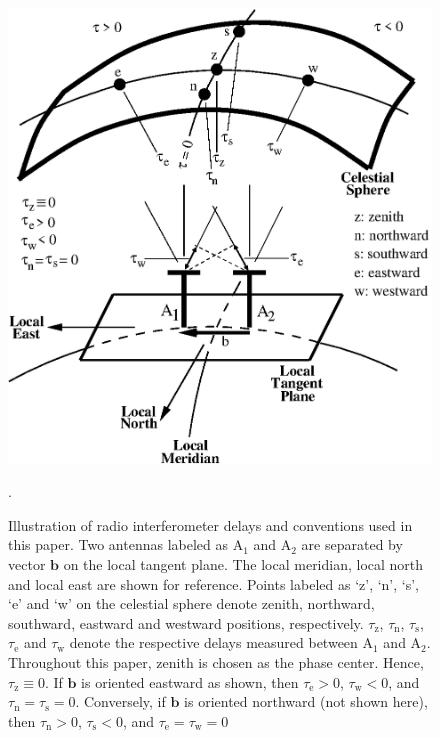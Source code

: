 \documentclass[preprint2,iop,numberedappendix,twocolappendix,appendixfloats]{emulateapj}
\begin{document}
\begin{figure}[htb]
\centering
\includegraphics[width=\linewidth]{figureA1.eps}
\caption{Illustration of radio interferometer delays and conventions used in this paper. Two antennas labeled as A$_1$ and A$_2$ are separated by vector $\boldsymbol{b}$ on the local tangent plane. The local meridian, local north and local east are shown for reference. Points labeled as `z', `n', `s', `e' and `w' on the celestial sphere denote zenith, northward, southward, eastward and westward positions, respectively. $\tau_\textrm{z}$, $\tau_\textrm{n}$, $\tau_\textrm{s}$, $\tau_\textrm{e}$ and $\tau_\textrm{w}$ denote the respective delays measured between A$_1$ and A$_2$. Throughout this paper, zenith is chosen as the phase center. Hence, $\tau_\textrm{z}\equiv 0$. If $\boldsymbol{b}$ is oriented eastward as shown, then $\tau_\textrm{e} > 0$, $\tau_\textrm{w} < 0$, and $\tau_\textrm{n}=\tau_\textrm{s}=0$. Conversely, if $\boldsymbol{b}$ is oriented northward (not shown here), then $\tau_\textrm{n} > 0$, $\tau_\textrm{s} < 0$, and $\tau_\textrm{e}=\tau_\textrm{w}=0$}. \label{fig:delay-cartoon}
\end{figure}
\end{document}
